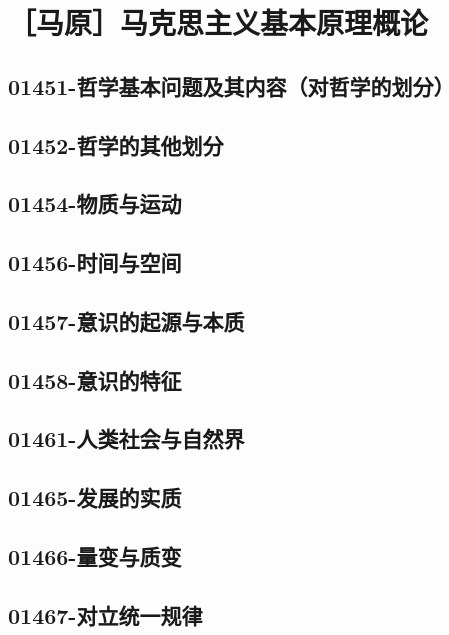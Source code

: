 \section{［马原］马克思主义基本原理概论}

\subsection{01451-哲学基本问题及其内容（对哲学的划分）}

\subsection{01452-哲学的其他划分}

\subsection{01454-物质与运动}

\subsection{01456-时间与空间}

\subsection{01457-意识的起源与本质}

\subsection{01458-意识的特征}

\subsection{01461-人类社会与自然界}

\subsection{01465-发展的实质}

\subsection{01466-量变与质变}

\subsection{01467-对立统一规律}

